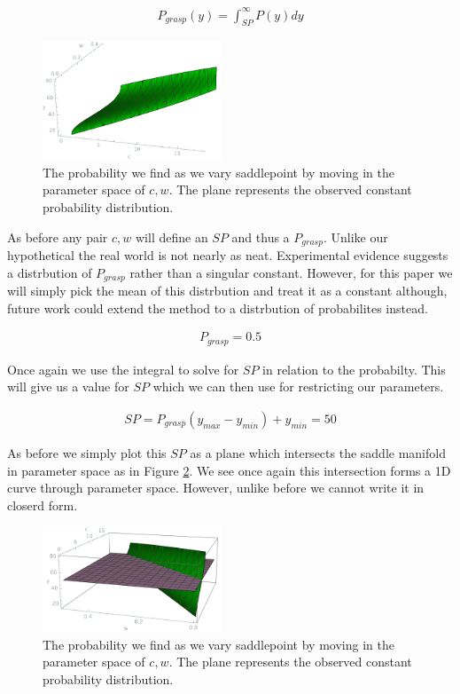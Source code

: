 \documentclass[letterpaper]{article}
\begin{document}
\begin{eqnarray}
    P_{grasp}(y) = \int_{SP}^{\infty}P(y)dy
\end{eqnarray}

\begin{figure}[t]
\begin{center}
\includegraphics[width=2.1in,angle=0]{./saddle_prehension.png}
\caption{The probability we find as we vary saddlepoint by moving in the 
parameter space of $c,w$. The plane represents the observed constant probability 
distribution.}
\label{prehension_saddle}
\end{center}
\end{figure}

As before any pair $c,w$ will define an $SP$ and thus a $P_{grasp}$. Unlike 
our hypothetical the real world is not nearly as neat. Experimental evidence suggests
a distrbution of $P_{grasp}$ rather than a singular constant. However, for this paper
we will simply pick the mean of this distrbution and treat it as a constant although,
future work could extend the method to a distrbution of probabilites instead.

\begin{eqnarray}
  P_{grasp} = 0.5
\end{eqnarray}

Once again we use the integral to solve for $SP$ in relation to the probabilty. This
will give us a value for $SP$ which we can then use for restricting our parameters.

\begin{eqnarray}
  SP = P_{grasp}(y_{max}-y_{min}) + y_{min} = 50
\end{eqnarray}

As before we simply plot this $SP$ as a plane which intersects the saddle manifold
in parameter space as in Figure \ref{prehension_h}. We see once again this intersection
forms a 1D curve through parameter space. However, unlike before we cannot write it 
in closerd form.

\begin{figure}[t]
\begin{center}
\includegraphics[width=2.1in,angle=0]{./prehension_h.png}
\caption{The probability we find as we vary saddlepoint by moving in the 
parameter space of $c,w$. The plane represents the observed constant probability 
distribution.}
\label{prehension_h}
\end{center}
\end{figure}
\end{document}

